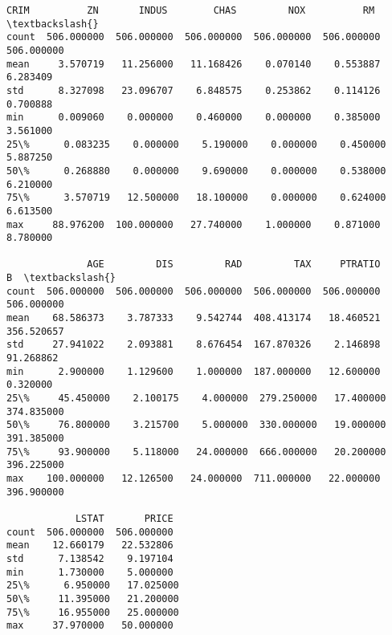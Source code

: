 \documentclass[11pt]{article}
\makeatletter
\newcommand{\boxspacing}{\kern\kvtcb@left@rule\kern\kvtcb@boxsep}
\newcommand{\prompt}[4]{
        {\ttfamily\llap{{\color{#2}[#3]:\hspace{3pt}#4}}\vspace{-\baselineskip}}
    }
\makeatother
\begin{document}
            \begin{tcolorbox}[breakable, size=fbox, boxrule=.5pt, pad at break*=1mm, opacityfill=0]
\prompt{Out}{outcolor}{5}{\boxspacing}
\begin{Verbatim}[commandchars=\\\{\}]
             CRIM          ZN       INDUS        CHAS         NOX          RM  \textbackslash{}
count  506.000000  506.000000  506.000000  506.000000  506.000000  506.000000
mean     3.570719   11.256000   11.168426    0.070140    0.553887    6.283409
std      8.327098   23.096707    6.848575    0.253862    0.114126    0.700888
min      0.009060    0.000000    0.460000    0.000000    0.385000    3.561000
25\%      0.083235    0.000000    5.190000    0.000000    0.450000    5.887250
50\%      0.268880    0.000000    9.690000    0.000000    0.538000    6.210000
75\%      3.570719   12.500000   18.100000    0.000000    0.624000    6.613500
max     88.976200  100.000000   27.740000    1.000000    0.871000    8.780000

              AGE         DIS         RAD         TAX     PTRATIO           B  \textbackslash{}
count  506.000000  506.000000  506.000000  506.000000  506.000000  506.000000
mean    68.586373    3.787333    9.542744  408.413174   18.460521  356.520657
std     27.941022    2.093881    8.676454  167.870326    2.146898   91.268862
min      2.900000    1.129600    1.000000  187.000000   12.600000    0.320000
25\%     45.450000    2.100175    4.000000  279.250000   17.400000  374.835000
50\%     76.800000    3.215700    5.000000  330.000000   19.000000  391.385000
75\%     93.900000    5.118000   24.000000  666.000000   20.200000  396.225000
max    100.000000   12.126500   24.000000  711.000000   22.000000  396.900000

            LSTAT       PRICE
count  506.000000  506.000000
mean    12.660179   22.532806
std      7.138542    9.197104
min      1.730000    5.000000
25\%      6.950000   17.025000
50\%     11.395000   21.200000
75\%     16.955000   25.000000
max     37.970000   50.000000
\end{Verbatim}
\end{tcolorbox}
        
\end{document}
